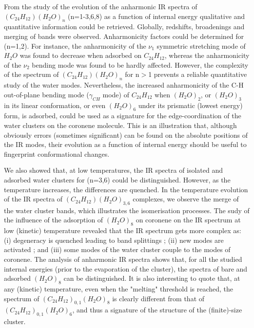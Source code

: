 \documentclass[]{interact}
\theoremstyle{plain}%
\theoremstyle{definition}
\theoremstyle{remark}
\begin{document}
		
		From the study of the evolution of the anharmonic IR spectra of $(C_{ 24}H_{12})(H_{2}O)_{n}$ (n=1-3,6,8) as a function of internal energy  %
		qualitative and quantitative information could be retrieved. Globally, redshifts, broadenings and merging of bands were observed. Anharmonicity factors could be determined for (n=1,2).  
		For instance, the anharmonicity of the $\nu_{1}$ symmetric stretching mode of $H_{2}O$ was found to decrease when adsorbed on $C_{ 24}H_{12}$, whereas the anharmonicity of the $\nu_{2}$ bending  mode was found to be hardly affected. However, the complexity of the spectrum of $(C_{ 24}H_{12})(H_{2}O)_{n}$ for n$>$1  prevents a reliable quantitative study of the water modes. Nevertheless, the increased anharmonicity of the C-H out-of-plane bending mode ($\gamma_{CH}$ mode) of $C_{ 24}H_{12}$ when $(H_{2}O)_{2}$, or $(H_{2}O)_{3}$ in its linear conformation, or even  $(H_{2}O)_{6}$ under its prismatic (lowest energy) form,  is adsorbed, could be used as a  signature for the edge-coordination of the water clusters on the coronene molecule. This is an illustration that, although obviously errors (sometimes significant) can be found on the absolute positions of the IR modes, their evolution as a function of internal energy should be useful to fingerprint conformational changes.
		
		We also showed that, at low temperatures, the IR spectra of isolated and adsorbed water clusters for (n=3,6) could be distinguished. However, as the temperature increases, the differences are quenched. In the temperature evolution of the IR spectra of $(C_{24}H_{12})(H_{2}O)_{3,6}$ complexes, we observe the merge of the water cluster bands, which illustrates the isomerisation processes.  The sudy of  the influence of the adsorption of $(H_{2}O)_{8}$  on coronene on the IR spectrum at low (kinetic) temperature revealed that the IR spectrum gets more complex as: (i) degeneracy is quenched leading to band splittings ; (ii) new modes are activated ; and (iii) some modes of the water cluster couple to the modes of coronene. The analysis of anharmonic IR spectra shows that, for all the studied internal energies (prior to the evaporation of the cluster), the spectra of bare and adsorbed $(H_{2}O)_{8}$ can be distinguished. It is also interesting to quote that, at any (kinetic) temperature, even when the "melting" threshold  is reached, the spectrum of $(C_{24}H_{12})_{0,1}(H_{2}O)_{8}$ is clearly different from that of $(C_{24}H_{12})_{0,1}(H_{2}O)_{6}$, and thus a signature of the structure of the (finite)-size cluster.
\end{document}
